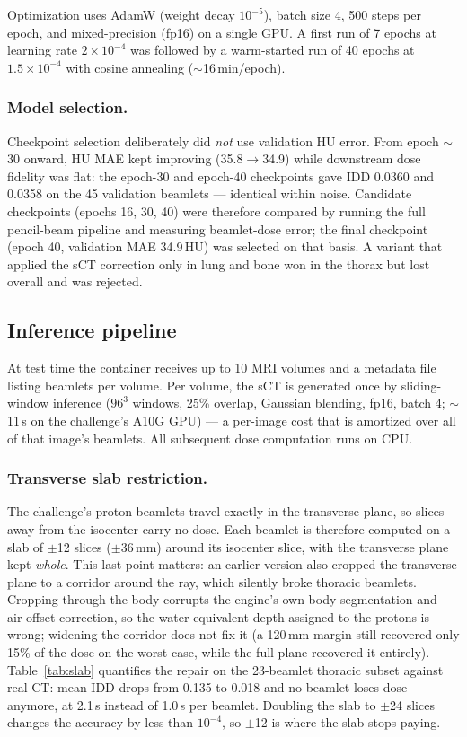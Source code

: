 \documentclass[runningheads]{llncs}
\begin{document}
Optimization uses AdamW (weight decay $10^{-5}$), batch size 4, 500 steps per epoch, and mixed-precision (fp16) on a single GPU. A first run of 7 epochs at learning rate $2\times10^{-4}$ was followed by a warm-started run of 40 epochs at $1.5\times10^{-4}$ with cosine annealing ($\sim$16\,min/epoch).

\subsubsection{Model selection.}
Checkpoint selection deliberately did \emph{not} use validation HU error. From epoch $\sim$30 onward, HU MAE kept improving (35.8$\rightarrow$34.9) while downstream dose fidelity was flat: the epoch-30 and epoch-40 checkpoints gave IDD 0.0360 and 0.0358 on the 45 validation beamlets --- identical within noise. Candidate checkpoints (epochs 16, 30, 40) were therefore compared by running the full pencil-beam pipeline and measuring beamlet-dose error; the final checkpoint (epoch 40, validation MAE 34.9\,HU) was selected on that basis. A variant that applied the sCT correction only in lung and bone won in the thorax but lost overall and was rejected.

\subsection{Inference pipeline}
\label{sec:slab}
At test time the container receives up to 10 MRI volumes and a metadata file listing beamlets per volume. Per volume, the sCT is generated once by sliding-window inference ($96^3$ windows, 25\% overlap, Gaussian blending, fp16, batch 4; $\sim$11\,s on the challenge's A10G GPU) --- a per-image cost that is amortized over all of that image's beamlets. All subsequent dose computation runs on CPU.

\subsubsection{Transverse slab restriction.}
The challenge's proton beamlets travel exactly in the transverse plane, so slices away from the isocenter carry no dose. Each beamlet is therefore computed on a slab of $\pm$12 slices ($\pm$36\,mm) around its isocenter slice, with the transverse plane kept \emph{whole}. This last point matters: an earlier version also cropped the transverse plane to a corridor around the ray, which silently broke thoracic beamlets. Cropping through the body corrupts the engine's own body segmentation and air-offset correction, so the water-equivalent depth assigned to the protons is wrong; widening the corridor does not fix it (a 120\,mm margin still recovered only 15\% of the dose on the worst case, while the full plane recovered it entirely). Table~\ref{tab:slab} quantifies the repair on the 23-beamlet thoracic subset against real CT: mean IDD drops from 0.135 to 0.018 and no beamlet loses dose anymore, at 2.1\,s instead of 1.0\,s per beamlet. Doubling the slab to $\pm$24 slices changes the accuracy by less than $10^{-4}$, so $\pm$12 is where the slab stops paying.
\end{document}
